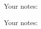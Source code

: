 \documentclass[9pt,a4wide]{extarticle}
\begin{document}
\newpage

Your notes:

\newpage

Your notes:

\end{document}
